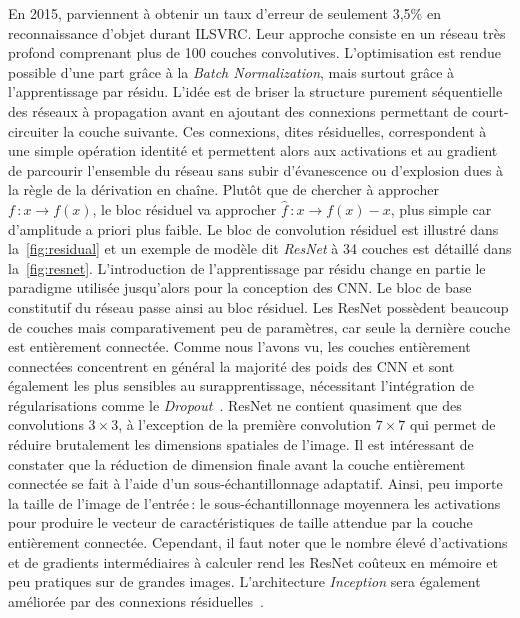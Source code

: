En 2015, \citet{he_deep_2016} parviennent à obtenir un taux d'erreur de seulement 3,5\% en reconnaissance d'objet durant \gls{ILSVRC}. Leur approche consiste en un réseau très profond comprenant plus de 100 couches convolutives. L'optimisation est rendue possible d'une part grâce à la \emph{Batch Normalization}, mais surtout grâce à l'apprentissage par résidu. L'idée est de briser la structure purement séquentielle des réseaux à propagation avant en ajoutant des connexions permettant de court-circuiter la couche suivante. Ces connexions, dites résiduelles, correspondent à une simple opération identité et permettent alors aux activations et au gradient de parcourir l'ensemble du réseau sans subir d’évanescence ou d'explosion dues à la règle de la dérivation en chaîne. Plutôt que de chercher à approcher $f\,: x \rightarrow f(x)$, le bloc résiduel va approcher $\hat{f}\,: x \rightarrow f(x) - x$, plus simple car d'amplitude a priori plus faible. Le bloc de convolution résiduel est illustré dans la~\cref{fig:residual} et un exemple de modèle dit \emph{ResNet} à 34 couches est détaillé dans la~\cref{fig:resnet}. L'introduction de l'apprentissage par résidu change en partie le paradigme utilisée jusqu'alors pour la conception des \gls{CNN}. Le bloc de base constitutif du réseau passe ainsi au bloc résiduel.
Les ResNet possèdent beaucoup de couches mais comparativement peu de paramètres, car seule la dernière couche est entièrement connectée. Comme nous l'avons vu, les couches entièrement connectées concentrent en général la majorité des poids des \gls{CNN} et sont également les plus sensibles au surapprentissage, nécessitant l'intégration de régularisations comme le \emph{Dropout}~\cite{srivastava_dropout_2014}. ResNet ne contient quasiment que des convolutions $3\times3$, à l'exception de la première convolution $7\times7$ qui permet de réduire brutalement les dimensions spatiales de l'image. Il est intéressant de constater que la réduction de dimension finale avant la couche entièrement connectée se fait à l'aide d'un sous-échantillonnage adaptatif. Ainsi, peu importe la taille de l'image de l'entrée\,: le sous-échantillonnage moyennera les activations pour produire le vecteur de caractéristiques de taille attendue par la couche entièrement connectée. Cependant, il faut noter que le nombre élevé d'activations et de gradients intermédiaires à calculer rend les ResNet coûteux en mémoire et peu pratiques sur de grandes images. L'architecture \emph{Inception} sera également améliorée par des connexions résiduelles~\cite{szegedy_inception-v4_2017}.


